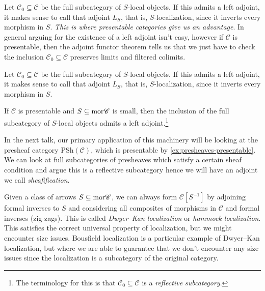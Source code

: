 \documentclass[11pt,openany]{book}
\renewcommand{\Pre}{\mathrm{PSh}}
\begin{document}
\begin{remark} Let $\mathscr{C}_0 \subseteq \mathscr{C}$ be the full subcategory of $S$-local objects. If this admits a left adjoint, it makes sense to call that adjoint $L_S$, that is, $S$-localization, since it inverts every morphism in $S$. \textit{This is where presentable categories give us an advantage}. In general arguing for the existence of a left adjoint isn't easy, however if $\mathscr{C}$ is presentable, then the adjoint functor theorem tells us that we just have to check the inclusion $\mathscr{C}_0 \subseteq \mathscr{C}$ preserves limits and filtered colimits.
\end{remark}
Let $\mathscr{C}_0 \subseteq \mathscr{C}$ be the full subcategory of $S$-local objects. If this admits a left adjoint, it makes sense to call that adjoint $L_S$, that is, $S$-localization, since it inverts every morphism in $S$.

\begin{proposition}\label{prop:localization-at-set-of-morphisms} 
\cite[5.5.4.15]{HTT} If $\mathscr{C}$ is presentable and $S \subseteq \mathrm{mor} \mathscr{C}$ is small, then the inclusion of the full subcategory of $S$-local objects admits a left adjoint.\footnote{The terminology for this is that $\mathscr{C}_0 \subseteq \mathscr{C}$ is a \textit{reflective subcategory}.}
\end{proposition}

\begin{example} In the next talk, our primary application of this machinery will be looking at the presheaf category $\Pre(\mathscr{C})$, which is presentable by \autoref{ex:presheaves-presentable}. We can look at full subcategories of presheaves which satisfy a certain sheaf condition and argue this is a reflective subcategory hence we will have an adjoint we call \textit{sheafification}.
\end{example}

\begin{remark} Given a class of arrows $S \subseteq \mathrm{mor} \mathscr{C}$, we can always form $\mathscr{C}[S^{-1}]$ by adjoining formal inverses to $S$ and considering all composites of morphisms in $\mathscr{C}$ and formal inverses (zig-zags). This is called \textit{Dwyer--Kan localization} or \textit{hammock localization}. This satisfies the correct universal property of localization, but we might encounter size issues. Bousfield localization is a particular example of Dwyer--Kan localization, but where we are able to guarantee that we don't encounter any size issues since the localization is a subcategory of the original category.
\end{remark}
\end{document}
